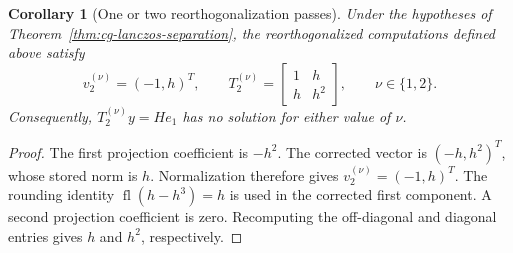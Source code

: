 \documentclass[11pt]{article}
\newtheorem{corollary}{Corollary}
\theoremstyle{definition}
\newcommand{\fl}{\operatorname{fl}}
\begin{document}
\begin{corollary}[One or two reorthogonalization passes]
\label{cor:cg-lanczos-reorthogonalization}
Under the hypotheses of Theorem~\ref{thm:cg-lanczos-separation}, the
reorthogonalized computations defined above satisfy
\[
 v_2^{(\nu)}=(-1,h)^T,
 \qquad
 T_2^{(\nu)}=\begin{bmatrix}1&h\\h&h^2\end{bmatrix},
 \qquad \nu\in\{1,2\}.
\]
Consequently, $T_2^{(\nu)}y=He_1$ has no solution for either value of $\nu$.
\end{corollary}

\begin{proof}
The first projection coefficient is $-h^2$.  The corrected vector is
$(-h,h^2)^T$, whose stored norm is $h$.  Normalization therefore gives
$v_2^{(\nu)}=(-1,h)^T$.  The rounding identity $\fl(h-h^3)=h$ is used
in the corrected first component.  A second projection coefficient is
zero.  Recomputing the off-diagonal and diagonal entries gives $h$ and
$h^2$, respectively.
\end{proof}
\end{document}
